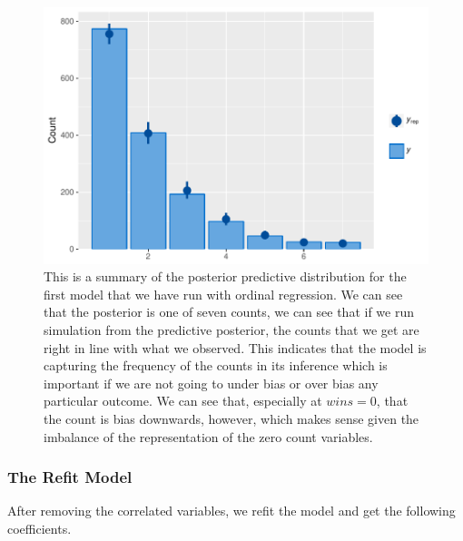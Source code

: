 \documentclass[10pt,a4paper, hidelinks]{article} %
\begin{document}
\begin{figure}[H]
	\centering
	\includegraphics[width=0.7\linewidth]{../fig/polr_nonames_pp}
	\caption{This is a summary of the posterior predictive distribution for the first model that we have run with ordinal regression. We can see that the posterior is one of seven counts, we can see that if we run simulation from the predictive posterior, the counts that we get are right in line with what we observed. This indicates that the model is capturing the frequency of the counts in its inference which is important if we are not going to under bias or over bias any particular outcome. We can see that, especially at $wins = 0$, that the count is bias downwards, however, which makes sense given the imbalance of the representation of the zero count variables.}
	\label{fig:polrnonamespp}
\end{figure}


\subsubsection{The Refit Model}

After removing the correlated variables, we refit the model and get the following coefficients.

\begin{figure}[H]
	\centering
	
\end{figure}
\end{document}
